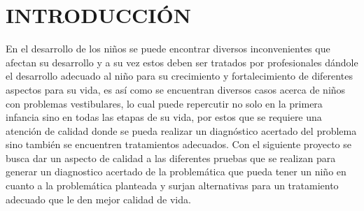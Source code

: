 \section*{INTRODUCCIÓN}
    En el desarrollo de los niños se puede encontrar diversos inconvenientes que afectan su desarrollo y a su vez estos deben ser tratados por profesionales dándole el desarrollo adecuado al niño para su crecimiento y fortalecimiento de diferentes aspectos para su vida, es así como se encuentran diversos casos acerca de niños con problemas vestibulares, lo cual puede repercutir no solo en la primera infancia sino en todas las etapas de su vida, por estos que se requiere una atención de calidad donde se pueda realizar un diagnóstico acertado del problema sino también se encuentren tratamientos adecuados.
    Con el siguiente proyecto se busca dar un aspecto de calidad a las diferentes pruebas que se realizan para generar un diagnostico acertado de la problemática que pueda tener un niño en cuanto a la problemática planteada y surjan alternativas para un tratamiento adecuado que le den mejor calidad de vida.